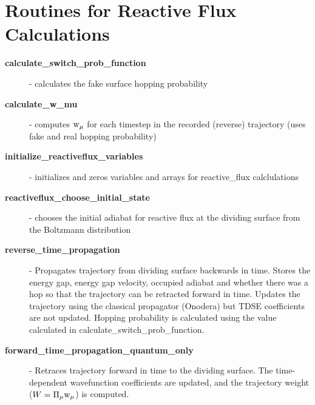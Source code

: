 \documentclass[oneside,11pt,openany]{book}
\newcommand{\tw}{\ttfamily}
\begin{document}
\section{Routines for Reactive Flux Calculations}
\begin{description}
\item[{\tw\bf calculate\_switch\_prob\_function}] - calculates the fake surface hopping probability 
\item[{\tw\bf calculate\_w\_mu}] - computes $\rm{w}_\mu$ for each timestep in the recorded (reverse) trajectory (uses fake and real hopping probability)
\item[{\tw\bf initialize\_reactiveflux\_variables}] - initializes and zeros variables and arrays for reactive\_flux calclulations
\item[{\tw\bf reactiveflux\_choose\_initial\_state}] - chooses the initial adiabat for reactive flux at the dividing surface from the Boltzmann distribution
\item[{\tw\bf reverse\_time\_propagation}] - Propagates trajectory from dividing surface backwards in time.  Stores the energy gap, energy gap velocity, occupied adiabat and whether there was a hop so that the trajectory can be retracted forward in time.  Updates the trajectory using the classical propagator (Onodera) but TDSE coefficients are not updated.  Hopping probability is calculated using the value calculated in calculate\_switch\_prob\_function.
\item[{\tw\bf forward\_time\_propagation\_quantum\_only}] - Retraces trajectory forward in time to the dividing surface.  The time-dependent wavefunction coefficients are updated, and the trajectory weight ($W = \Pi_\mu \rm{w}_\mu$) is computed.
\end{description}

%
\end{document}
